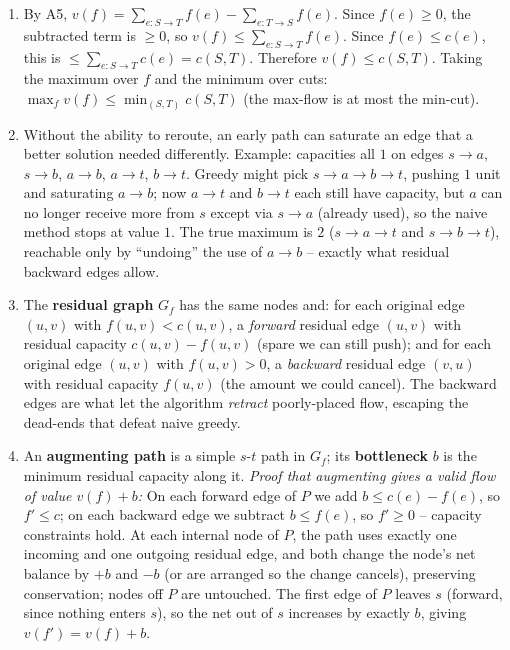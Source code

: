 \documentclass[11pt]{article}
\begin{document}
\begin{enumerate}[label=\textbf{A\arabic*.}, leftmargin=2.2em]
\item By A5, $v(f) = \sum_{e:S\to T} f(e) - \sum_{e:T\to S} f(e)$. Since $f(e)\ge0$, the
subtracted term is $\ge 0$, so $v(f) \le \sum_{e:S\to T} f(e)$. Since $f(e)\le c(e)$, this
is $\le \sum_{e:S\to T} c(e) = c(S,T)$. Therefore $v(f) \le c(S,T)$. Taking the maximum
over $f$ and the minimum over cuts: $\max_f v(f) \le \min_{(S,T)} c(S,T)$ (the max-flow is
at most the min-cut).

\item Without the ability to reroute, an early path can saturate an edge that a better
solution needed differently. Example: capacities all $1$ on edges $s\to a$, $s\to b$,
$a\to b$, $a\to t$, $b\to t$. Greedy might pick $s\to a\to b\to t$, pushing $1$ unit and
saturating $a\to b$; now $a\to t$ and $b\to t$ each still have capacity, but $a$ can no
longer receive more from $s$ except via $s\to a$ (already used), so the naive method stops
at value $1$. The true maximum is $2$ ($s\to a\to t$ and $s\to b\to t$), reachable only by
``undoing'' the use of $a\to b$ -- exactly what residual backward edges allow.

\item The \textbf{residual graph} $G_f$ has the same nodes and: for each original edge
$(u,v)$ with $f(u,v) < c(u,v)$, a \emph{forward} residual edge $(u,v)$ with residual
capacity $c(u,v)-f(u,v)$ (spare we can still push); and for each original edge $(u,v)$ with
$f(u,v) > 0$, a \emph{backward} residual edge $(v,u)$ with residual capacity $f(u,v)$ (the
amount we could cancel). The backward edges are what let the algorithm \emph{retract}
poorly-placed flow, escaping the dead-ends that defeat naive greedy.

\item An \textbf{augmenting path} is a simple $s$-$t$ path in $G_f$; its \textbf{bottleneck}
$b$ is the minimum residual capacity along it. \emph{Proof that augmenting gives a valid
flow of value $v(f)+b$:} On each forward edge of $P$ we add $b \le c(e)-f(e)$, so $f'\le
c$; on each backward edge we subtract $b \le f(e)$, so $f'\ge 0$ -- capacity constraints
hold. At each internal node of $P$, the path uses exactly one incoming and one outgoing
residual edge, and both change the node's net balance by $+b$ and $-b$ (or are arranged so
the change cancels), preserving conservation; nodes off $P$ are untouched. The first edge
of $P$ leaves $s$ (forward, since nothing enters $s$), so the net out of $s$ increases by
exactly $b$, giving $v(f') = v(f)+b$.


\end{enumerate}
\end{document}
